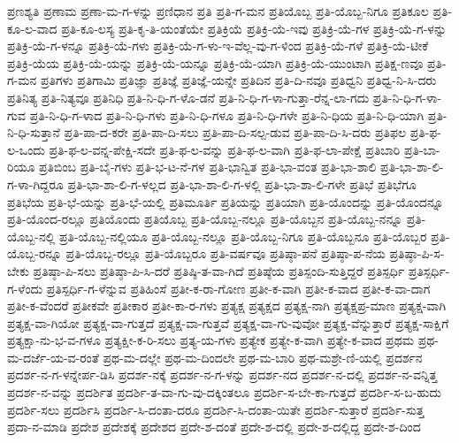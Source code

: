 {ಪ್ರಣಶ್ಯತಿ
ಪ್ರಣಾಮ
ಪ್ರಣಾ-ಮ-ಗ-ಳನ್ನು
ಪ್ರಣಿಧಾನ
ಪ್ರತಿ
ಪ್ರತಿ-ಗ-ಮನ
ಪ್ರತಿಯೊಬ್ಬ
ಪ್ರತಿ-ಯೊಬ್ಬ-ನಿಗೂ
ಪ್ರತಿಕೂಲ
ಪ್ರತಿ-ಕೂ-ಲ-ವಾದ
ಪ್ರತಿ-ಕೂ-ಲಸ್ಯ
ಪ್ರತಿ-ಕೃ-ತಿ-ಯಂತೆಯೇ
ಪ್ರತಿಕ್ರಿಯೆ
ಪ್ರತಿಕ್ರಿ-ಯೆ-ಇವು
ಪ್ರತಿಕ್ರಿ-ಯೆ-ಗಳ
ಪ್ರತಿಕ್ರಿ-ಯೆ-ಗ-ಳನ್ನು
ಪ್ರತಿಕ್ರಿ-ಯೆ-ಗ-ಳನ್ನೂ
ಪ್ರತಿಕ್ರಿ-ಯೆ-ಗಳು
ಪ್ರತಿಕ್ರಿ-ಯೆ-ಗ-ಳು-ಇ-ವೆಲ್ಲ-ವು-ಗ-ಳಿಂದ
ಪ್ರತಿಕ್ರಿ-ಯೆ-ಗಳೆ
ಪ್ರತಿಕ್ರಿ-ಯೆ-ಟೀಕೆ
ಪ್ರತಿಕ್ರಿ-ಯೆಯ
ಪ್ರತಿಕ್ರಿ-ಯೆ-ಯನ್ನು
ಪ್ರತಿಕ್ರಿ-ಯೆ-ಯನ್ನೂ
ಪ್ರತಿಕ್ರಿ-ಯೆ-ಯಾಗಿ
ಪ್ರತಿಕ್ರಿ-ಯೆ-ಯುಂಟಾಗಿ
ಪ್ರತಿಕ್ಷ-ಣವೂ
ಪ್ರತಿ-ಗ-ಮನ
ಪ್ರತಿಗಳು
ಪ್ರತಿಗಾಮಿ
ಪ್ರತಿಜ್ಞಾ
ಪ್ರತಿಜ್ಞೆ
ಪ್ರತಿಜ್ಞೆ-ಯನ್ನೇ
ಪ್ರತಿದಿನ
ಪ್ರತಿ-ದಿ-ನವೂ
ಪ್ರತಿಧ್ವನಿ
ಪ್ರತಿಧ್ವ-ನಿ-ಸಿ-ದರು
ಪ್ರತಿನಿತ್ಯ
ಪ್ರತಿ-ನಿತ್ಯವೂ
ಪ್ರತಿನಿಧಿ
ಪ್ರತಿ-ನಿ-ಧಿ-ಗ-ಳೊ-ಡನೆ
ಪ್ರತಿ-ನಿ-ಧಿ-ಗ-ಳಾ-ಗುತ್ತಾ-ರೆನ್ನ-ಲಾ-ಗದು
ಪ್ರತಿ-ನಿ-ಧಿ-ಗ-ಳಾ-ಗುವ
ಪ್ರತಿ-ನಿ-ಧಿ-ಗ-ಳಾದ
ಪ್ರತಿ-ನಿ-ಧಿ-ಗಳು
ಪ್ರತಿ-ನಿ-ಧಿ-ಗಳೂ
ಪ್ರತಿ-ನಿ-ಧಿ-ಗಳೇ
ಪ್ರತಿ-ನಿ-ಧಿಯ
ಪ್ರತಿ-ನಿ-ಧಿ-ಯಾಗಿ
ಪ್ರತಿ-ನಿ-ಧಿ-ಸುತ್ತಾನೆ
ಪ್ರತಿ-ಪಾ-ದ-ಕರೇ
ಪ್ರತಿ-ಪಾ-ದಿ-ಸಲು
ಪ್ರತಿ-ಪಾ-ದಿ-ಸಲ್ಪ-ಡುವ
ಪ್ರತಿ-ಪಾ-ದಿ-ಸಿ-ದರು
ಪ್ರತಿಫಲ
ಪ್ರತಿ-ಫ-ಲ-ಒಂದು
ಪ್ರತಿ-ಫ-ಲ-ವನ್ನ-ಪೇಕ್ಷಿ-ಸದೇ
ಪ್ರತಿ-ಫ-ಲ-ವನ್ನು
ಪ್ರತಿ-ಫ-ಲ-ವಾಗಿ
ಪ್ರತಿ-ಫ-ಲಾ-ಪೇಕ್ಷೆ
ಪ್ರತಿಬಾರಿ
ಪ್ರತಿ-ಬಾ-ರಿಯೂ
ಪ್ರತಿಬಿಂಬ
ಪ್ರತಿ-ಬೈ-ಗಳು
ಪ್ರತಿ-ಭ-ಟ-ನೆ-ಗಳ
ಪ್ರತಿ-ಭಾನ್ವಿತ
ಪ್ರತಿ-ಭಾ-ವಂತ
ಪ್ರತಿ-ಭಾ-ಶಾಲಿ
ಪ್ರತಿ-ಭಾ-ಶಾ-ಲಿ-ಗ-ಳಾ-ಗಿದ್ದರೂ
ಪ್ರತಿ-ಭಾ-ಶಾ-ಲಿ-ಗ-ಳಲ್ಲದ
ಪ್ರತಿ-ಭಾ-ಶಾ-ಲಿ-ಗ-ಳಲ್ಲಿ
ಪ್ರತಿ-ಭಾ-ಶಾ-ಲಿ-ಗಳೇ
ಪ್ರತಿಭೆ
ಪ್ರತಿಭೆಗೂ
ಪ್ರತಿಭೆಯ
ಪ್ರತಿ-ಭೆ-ಯನ್ನು
ಪ್ರತಿ-ಭೆ-ಯಲ್ಲಿ
ಪ್ರತಿಮೂರ್ತಿ
ಪ್ರತಿಯನ್ನು
ಪ್ರತಿಯಾಗಿ
ಪ್ರತಿ-ಯೊಂದನ್ನು
ಪ್ರತಿ-ಯೊಂದನ್ನೂ
ಪ್ರತಿ-ಯೊಂದ-ರಲ್ಲೂ
ಪ್ರತಿಯೊಂದು
ಪ್ರತಿಯೊಬ್ಬ
ಪ್ರತಿ-ಯೊಬ್ಬ-ನಲ್ಲೂ
ಪ್ರತಿ-ಯೊಬ್ಬನ
ಪ್ರತಿ-ಯೊಬ್ಬ-ನನ್ನೂ
ಪ್ರತಿ-ಯೊಬ್ಬ-ನಲ್ಲಿ
ಪ್ರತಿ-ಯೊಬ್ಬ-ನಲ್ಲಿಯೂ
ಪ್ರತಿ-ಯೊಬ್ಬ-ನಲ್ಲೂ
ಪ್ರತಿ-ಯೊಬ್ಬ-ನಿಗೂ
ಪ್ರತಿ-ಯೊಬ್ಬನೂ
ಪ್ರತಿ-ಯೊಬ್ಬರ
ಪ್ರತಿ-ಯೊಬ್ಬ-ರನ್ನೂ
ಪ್ರತಿ-ಯೊಬ್ಬ-ರಲ್ಲೂ
ಪ್ರತಿ-ಯೊಬ್ಬರೂ
ಪ್ರತಿ-ವರ್ಷವೂ
ಪ್ರತಿಷ್ಠಾ-ಪನೆ
ಪ್ರತಿಷ್ಠಾ-ಪ-ನೆಯ
ಪ್ರತಿಷ್ಠಾ-ಪಿ-ಸ-ಬೇಕು
ಪ್ರತಿಷ್ಠಾ-ಪಿ-ಸಲು
ಪ್ರತಿಷ್ಠಾ-ಪಿ-ಸಿ-ದರೆ
ಪ್ರತಿಷ್ಠಿ-ತ-ವಾ-ಗಿದೆ
ಪ್ರತಿಷ್ಠೆಯ
ಪ್ರತಿಸ್ಪಂದಿ-ಸುತ್ತಿದ್ದರೆ
ಪ್ರತಿಸ್ಪರ್ಧಿ
ಪ್ರತಿಸ್ಪರ್ಧಿ-ಗ-ಳೆಂದು
ಪ್ರತಿಸ್ಪರ್ಧಿ-ಗ-ಳೆನ್ನುವ
ಪ್ರತಿಹಿಂಸೆ
ಪ್ರತೀ-ಕ-ರಾ-ಗೋಣ
ಪ್ರತೀ-ಕ-ವಾಗಿ
ಪ್ರತೀ-ಕ-ವಾದ
ಪ್ರತೀ-ಕ-ವಾ-ದಾಗ
ಪ್ರತೀ-ಕ-ವೆಂದರೆ
ಪ್ರತೀಕವೇ
ಪ್ರತೀಕಾರ
ಪ್ರತೀ-ಕಾ-ರ-ಗಳು
ಪ್ರತ್ಯಕ್ಷ
ಪ್ರತ್ಯಕ್ಷದ
ಪ್ರತ್ಯಕ್ಷ-ನಾಗಿ
ಪ್ರತ್ಯಕ್ಷಪ್ರ-ಮಾಣ
ಪ್ರತ್ಯಕ್ಷ-ವಾಗಿ
ಪ್ರತ್ಯಕ್ಷ-ವಾ-ಗಿಯೋ
ಪ್ರತ್ಯಕ್ಷ-ವಾ-ಗುತ್ತದೆ
ಪ್ರತ್ಯಕ್ಷ-ವಾ-ಗುತ್ತವೆ
ಪ್ರತ್ಯಕ್ಷ-ವಾ-ಗು-ವುವೋ
ಪ್ರತ್ಯಕ್ಷ-ವೆನ್ನುತ್ತಾರೆ
ಪ್ರತ್ಯಕ್ಷ-ಸಾಕ್ಷಿಗೆ
ಪ್ರತ್ಯಕ್ಷಾ-ನು-ಭ-ವ-ಗಳೂ
ಪ್ರತ್ಯಕ್ಷೀ-ಕ-ರಿ-ಸಲು
ಪ್ರತ್ಯ-ಯ-ಗಳು
ಪ್ರತ್ಯೇಕ
ಪ್ರತ್ಯೇ-ಕ-ವಾಗಿ
ಪ್ರತ್ಯೇ-ಕ-ವಾದ
ಪ್ರಥಮ
ಪ್ರಥ-ಮ-ದರ್ಜೆ-ಯ-ವ-ರಂತೆ
ಪ್ರಥ-ಮ-ದಲ್ಲೇ
ಪ್ರಥ-ಮ-ದಿಂದಲೇ
ಪ್ರಥ-ಮ-ಬಾರಿ
ಪ್ರಥ-ಮಶ್ರೇ-ಣಿ-ಯಲ್ಲಿ
ಪ್ರದರ್ಶನ
ಪ್ರದರ್ಶ-ನ-ಗ-ಳನ್ನೇರ್ಪ-ಡಿಸಿ
ಪ್ರದರ್ಶ-ನಕ್ಕೆ
ಪ್ರದರ್ಶ-ನ-ಗ-ಳನ್ನು
ಪ್ರದರ್ಶ-ನದ
ಪ್ರದರ್ಶ-ನ-ದಲ್ಲಿ
ಪ್ರದರ್ಶ-ನ-ವನ್ನಿತ್ತ
ಪ್ರದರ್ಶ-ನ-ವನ್ನು
ಪ್ರದರ್ಶಿತ
ಪ್ರದರ್ಶಿ-ತ-ವಾ-ಗು-ವು-ದಕ್ಕಿಂತಲೂ
ಪ್ರದರ್ಶಿ-ಸ-ಬೇ-ಕಾ-ಗುತ್ತದೆ
ಪ್ರದರ್ಶಿ-ಸ-ಬ-ಹುದು
ಪ್ರದರ್ಶಿ-ಸಲು
ಪ್ರದರ್ಶಿಸಿ
ಪ್ರದರ್ಶಿ-ಸಿ-ದಂತಾ-ದರೂ
ಪ್ರದರ್ಶಿ-ಸಿ-ದಂತಾ-ಯಿತೇ
ಪ್ರದರ್ಶಿ-ಸುತ್ತಾರೆ
ಪ್ರದರ್ಶಿ-ಸುತ್ತ
ಪ್ರದಾ-ನ-ಮಾಡಿ
ಪ್ರದೇಶ
ಪ್ರದೇಶಕ್ಕೆ
ಪ್ರದೇಶದ
ಪ್ರದೇ-ಶ-ದಂತೆ
ಪ್ರದೇ-ಶ-ದಲ್ಲಿ
ಪ್ರದೇ-ಶ-ದಲ್ಲಿದ್ದ
ಪ್ರದೇ-ಶ-ದಿಂದ
}
